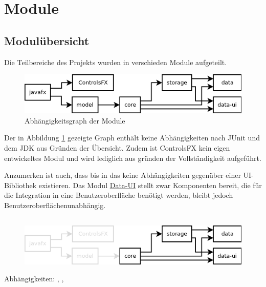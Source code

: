 
\newcommand{\depBox}[1]{
	\begin{adjustbox}{minipage=0.90\textwidth,margin=0 \smallskipamount,center}
		Abhängigkeiten:	 #1
	\end{adjustbox} ~\\
}

\section{Module}
\subsection{Modulübersicht}
Die Teilbereiche des Projekts wurden in verschieden Module aufgeteilt.

\begin{figure}[h!]
	\centering
	\includegraphics[width=.8\textwidth]{module_dependencies.png}
	\caption{Abhängigkeitsgraph der Module}
	\label{mod_dep_view}
\end{figure}

Der in Abbildung \ref{mod_dep_view} gezeigte Graph enthält keine Abhängigkeiten nach JUnit und
dem JDK aus Gründen der Übersicht. Zudem ist ControlsFX \cite{controlsfx} kein eigen
entwickeltes Modul und wird lediglich aus gründen der Vollständigkeit aufgeführt.

Anzumerken ist auch, dass bis in das  keine Abhängigkeiten
gegenüber einer UI-Bibliothek existieren. Das Modul \hyperref[mod_data-ui]{Data-UI} stellt
zwar Komponenten bereit, die für die Integration in eine Benutzeroberfläche benötigt werden,
bleibt jedoch Benutzeroberflächenunabhängig.


\subsection{\textModCore}
\label{\textModCore}
\begin{figure}[h!]
	\centering
	\includegraphics[width=.8\textwidth]{module_dependencies_core.png}
\end{figure}
\depBox{, , \refLongP{\textModStorage}}

